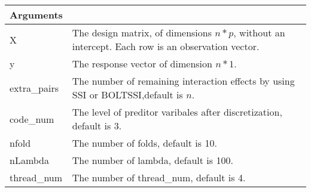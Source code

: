 \documentclass[]{article}
\begin{document}
\begin{longtable}[]{@{}ll@{}}
\toprule
\begin{minipage}[b]{0.12\columnwidth}\raggedright\strut
Arguments\strut
\end{minipage} & \begin{minipage}[b]{0.82\columnwidth}\raggedright\strut
\strut
\end{minipage}\tabularnewline
\midrule
\endhead
\begin{minipage}[t]{0.12\columnwidth}\raggedright\strut
X\strut
\end{minipage} & \begin{minipage}[t]{0.82\columnwidth}\raggedright\strut
The design matrix, of dimensions \(n*p\), without an intercept. Each row
is an observation vector.\strut
\end{minipage}\tabularnewline
\begin{minipage}[t]{0.12\columnwidth}\raggedright\strut
y\strut
\end{minipage} & \begin{minipage}[t]{0.82\columnwidth}\raggedright\strut
The response vector of dimension \(n*1\).\strut
\end{minipage}\tabularnewline
\begin{minipage}[t]{0.12\columnwidth}\raggedright\strut
extra\_pairs\strut
\end{minipage} & \begin{minipage}[t]{0.82\columnwidth}\raggedright\strut
The number of remaining interaction effects by using SSI or
BOLTSSI,default is \(n\).\strut
\end{minipage}\tabularnewline
\begin{minipage}[t]{0.12\columnwidth}\raggedright\strut
code\_num\strut
\end{minipage} & \begin{minipage}[t]{0.82\columnwidth}\raggedright\strut
The level of preditor varibales after discretization, default is
3.\strut
\end{minipage}\tabularnewline
\begin{minipage}[t]{0.12\columnwidth}\raggedright\strut
nfold\strut
\end{minipage} & \begin{minipage}[t]{0.82\columnwidth}\raggedright\strut
The number of folds, default is 10.\strut
\end{minipage}\tabularnewline
\begin{minipage}[t]{0.12\columnwidth}\raggedright\strut
nLambda\strut
\end{minipage} & \begin{minipage}[t]{0.82\columnwidth}\raggedright\strut
The number of lambda, default is 100.\strut
\end{minipage}\tabularnewline
\begin{minipage}[t]{0.12\columnwidth}\raggedright\strut
thread\_num\strut
\end{minipage} & \begin{minipage}[t]{0.82\columnwidth}\raggedright\strut
The number of thread\_num, default is 4.\strut
\end{minipage}\tabularnewline
\bottomrule
\end{longtable}
\end{document}
